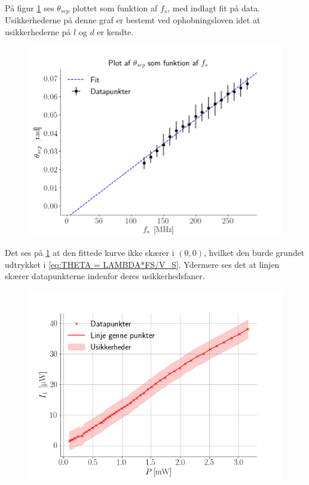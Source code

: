 \documentclass[main]{subfiles}
\begin{document}
På figur \cref{fig:graf1} ses $\theta_{sep}$ plottet som funktion af $f_s$, med indlagt fit på data. Usikkerhederne på denne graf er bestemt ved ophobningsloven idet at usikkerhederne på $l$ og $d$ er kendte.
\begin{figure}[H]
    \centering
    \includegraphics[width=\linewidth]{tegninger/graf1.png}
    \caption{}
    \label{fig:graf1}
\end{figure}
Det ses på \cref{fig:graf1} at den fittede kurve ikke skærer i $(0,0)$, hvilket den burde grundet udtrykket i \cref{eq:THETA = LAMBDA*FS/V_S}.%
Ydermere ses det at linjen skærer datapunkterne indenfor deres usikkerhedsfaner.
\begin{figure}[H]
    \centering
    \includegraphics[width=\linewidth]{tegninger/graf2.png}
    \caption{}
    \label{fig:graf2}
\end{figure}
\end{document}
